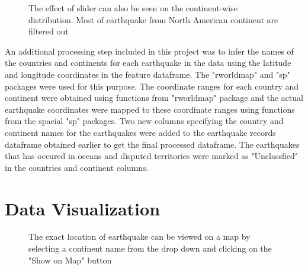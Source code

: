 \documentclass{article}
\begin{document}
		\begin{figure}
			\caption{The effect of slider can also be seen on the continent-wise distribution. Most of earthquake from North American continent are filtered out}
		\end{figure}
		
		An additional processing step included in this project was to infer the names of the countries and continents for each earthquake in the data using the latitude and longitude coordinates in the feature dataframe. The "rworldmap" and "sp" packages were used for this purpose. The coordinate ranges for each country and continent were obtained using functions
		from "rworldmap" package and the actual earthquake coordinates were mapped to these coordinate ranges using functions from the spacial "sp" packages. Two new columns specifying the country and continent names for the earthquakes were added to the earthquake records dataframe obtained earlier to get the final processed dataframe. The earthquakes that has occured in oceans and disputed territories were marked as "Unclassfied" in the countries and continent columns.
		
	\section{Data Visualization}
		
		\begin{figure}
			\caption{The exact location of earthquake can be viewed on a map by selecting a continent name from the drop down and clicking on the "Show on Map" button}
		\end{figure}
		
\end{document}
